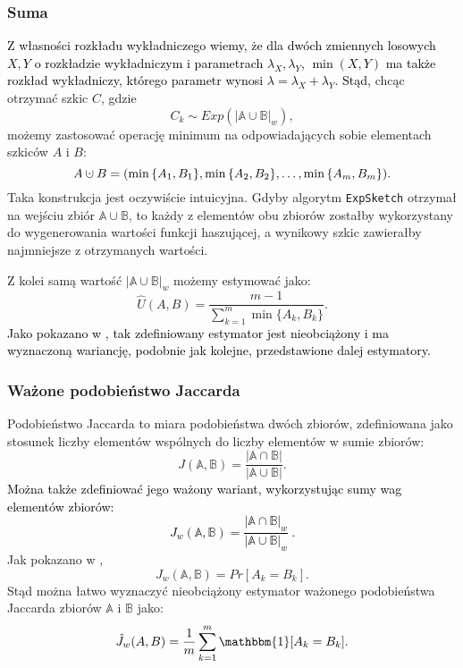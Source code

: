    \subsubsection*{Suma}
    \textcolor{black}{Z własności rozkładu wykładniczego wiemy, że dla dwóch zmiennych losowych $X, Y$ o rozkładzie wykładniczym i parametrach $\lambda_X, \lambda_Y$, $\min(X, Y)$ ma także rozkład wykładniczy, którego parametr wynosi $\lambda = \lambda_X + \lambda_Y$. Stąd, }chcąc otrzymać szkic $C$, gdzie 
    \[
        C_k \sim Exp(|\mathbb{A} \cup \mathbb{B}|_{w}), 
    \]
    możemy zastosować operację minimum na odpowiadających sobie elementach szkiców $A$ i $B$:    
    \[
        A \mathbin{\mathaccent\cdot\cup} B = (\min{\{A_1, B_1\}}, \min{\{A_2, B_2\}}, \dots, \min{\{A_m, B_m\}}).
    \]
    Taka konstrukcja jest oczywiście intuicyjna. Gdyby algorytm \texttt{ExpSketch} otrzymał na wejściu zbiór $\mathbb{A} \cup \mathbb{B}$, to każdy z elementów obu zbiorów zostałby wykorzystany do wygenerowania wartości funkcji haszującej, a wynikowy szkic zawierałby najmniejsze z otrzymanych wartości.
    
    Z kolei samą wartość $|\mathbb{A} \cup \mathbb{B}|_{w}$ możemy estymować jako:
    \[
        \hat{U}(A, B) = \frac{m - 1}{\sum\limits_{k = 1}^{m} \min{\{A_k, B_k\}}} .
    \]
    \textcolor{black}{Jako pokazano w \cite{Lemiesz_2023}, tak zdefiniowany estymator jest nieobciążony i ma wyznaczoną wariancję, podobnie jak kolejne, przedstawione dalej estymatory.}

    \subsubsection*{Ważone podobieństwo Jaccarda} 
    Podobieństwo Jaccarda to miara podobieństwa dwóch zbiorów, zdefiniowana jako stosunek liczby elementów wspólnych do liczby elementów w sumie zbiorów:
    \[
        J(\mathbb{A}, \mathbb{B}) = \frac{|\mathbb{A} \cap \mathbb{B}|}{|\mathbb{A} \cup \mathbb{B}|}.
    \]
    \textcolor{black}{Można także zdefiniować jego ważony wariant, wykorzystując sumy wag elementów zbiorów:
    \[
        J_w(\mathbb{A}, \mathbb{B}) = \frac{|\mathbb{A} \cap \mathbb{B}|_w}{|\mathbb{A} \cup \mathbb{B}|_w}~.
    \]}
    Jak pokazano w \cite{Lemiesz_2021}, 
    \[
        J_w(\mathbb{A}, \mathbb{B}) = Pr[A_k = B_k]. 
    \]
    Stąd można łatwo wyznaczyć nieobciążony estymator ważonego podobieństwa Jaccarda zbiorów $\mathbb{A}$ i $\mathbb{B}$ jako:
    \[
        \hat{J}_w(A, B) = \frac{1}{m} \sum\limits_{k = 1}^{m} \mathbbm{1}[A_k = B_k].  
    \]

